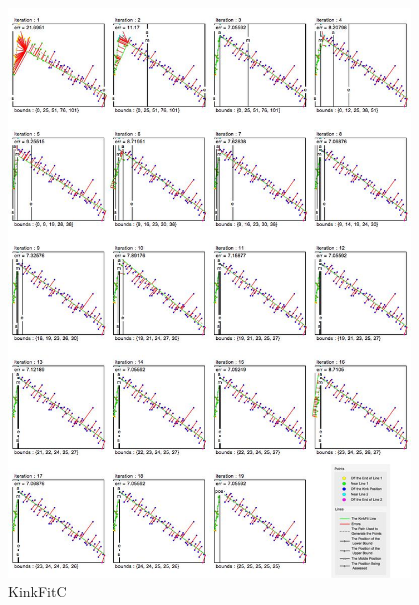 \begin{figure}[h!]
  \centering
    \includegraphics[width=0.95\textwidth]{Chapter4/Figs/KinkFit_C.jpg}
    \caption{KinkFitC}\label{fig:KinkFitC}
\end{figure}

